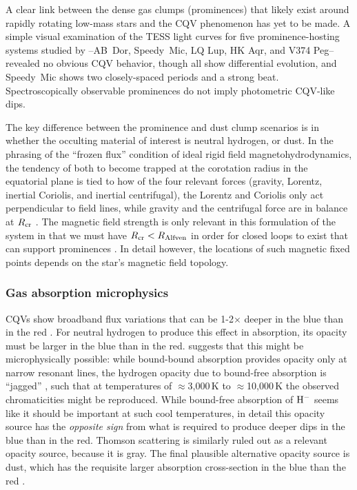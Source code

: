 \documentclass[11pt,twocolumn,tighten]{aastex63}
\begin{document}
A clear link between the dense gas clumps (prominences) that likely
exist around rapidly rotating low-mass stars and the CQV phenomenon
has yet to be made.  A simple visual examination of the TESS light
curves for five prominence-hosting systems studied by
\citet{2019MNRAS.482.2853J}--AB~Dor, Speedy~Mic, LQ Lup, HK Aqr, and
V374 Peg--revealed no obvious CQV behavior, though all show
differential evolution, and Speedy~Mic shows two closely-spaced
periods and a strong beat.  Spectroscopically observable prominences
do not imply photometric CQV-like dips.

The key difference between the prominence and dust clump scenarios is
in whether the occulting material of interest is neutral hydrogen, or
dust.  In the phrasing of the ``frozen flux'' condition of ideal rigid
field magnetohydrodynamics, the tendency of both to become trapped at
the corotation radius in the equatorial plane is tied to how of the
four relevant forces (gravity, Lorentz, inertial Coriolis, and
inertial centrifugal), the Lorentz and Coriolis only act perpendicular
to field lines, while gravity and the centrifugal force are in balance
at $R_{\rm cr}$ \citep[see][Sec.~2]{2005MNRAS.357..251T}.  The
magnetic field strength is only relevant in this formulation of the
system in that we must have $ R_{\rm cr} < R_{\rm Alfven}$ in order
for closed loops to exist that can support prominences
\citep[e.g.][]{1985Ap&SS.116..285N,2019MNRAS.482.2853J}.  In detail
however, the locations of such magnetic fixed points depends on the
star's magnetic field topology.


\subsubsection{Gas absorption microphysics}

CQVs show broadband flux variations that can be 1-2$\times$ deeper in
the blue than in the red
\citep{2017PASJ...69L...2O,2020AJ....160...86B,2022AJ....163..144G,2023MNRAS.518.2921K}.
For neutral hydrogen to produce this effect in absorption, its opacity
must be larger in the blue than in the red.
\citet{1992oasp.book.....G} suggests that this might be
microphysically possible: while bound-bound absorption provides
opacity only at narrow resonant lines, the hydrogen opacity due to
bound-free absorption is ``jagged'' \citep[see][Figure 8.5 and
Eq.~8.8]{1992oasp.book.....G}, such that at temperatures of
$\approx$3{,}000\,K to $\approx$10{,}000\,K the observed
chromaticities might be reproduced.  While bound-free absorption of
${\rm H}^{-}$ seems like it should be important at such cool
temperatures, in detail this opacity source has the {\it opposite
sign} from what is required to produce deeper dips in the blue than in
the red.  Thomson scattering is similarly ruled out as a relevant
opacity source, because it is gray.  The final plausible alternative
opacity source is dust, which has the requisite larger absorption
cross-section in the blue than the red \citep{1989ApJ...345..245C}.
\end{document}
